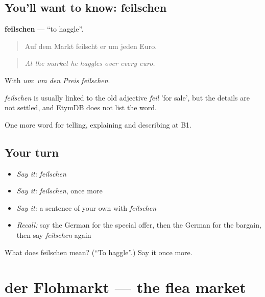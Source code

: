 \subsection*{You'll want to know: feilschen}
\textbf{feilschen} — \textquotedblleft{}to haggle\textquotedblright{}.

\begin{quote}
Auf dem Markt feilscht er um jeden Euro.
\end{quote}

\begin{quote}
\emph{At the market he haggles over every euro.}
\end{quote}

With \emph{um}: \emph{um den Preis feilschen}.

\begin{cousinweb}
\emph{feilschen} is usually linked to the old adjective \emph{feil} 'for sale', but the details are not settled, and EtymDB does not list the word.
\end{cousinweb}

\begin{grammarlens}[title={What you've built}]
One more word for telling, explaining and describing at B1.
\end{grammarlens}

\subsection*{Your turn}
\begin{itemize}
\raggedright
  \item \emph{Say it:} \emph{feilschen}
  \item \emph{Say it:} \emph{feilschen}, once more
  \item \emph{Say it:} a sentence of your own with \emph{feilschen}
  \item \emph{Recall:} say the German for the special offer, then the German for the bargain, then say \emph{feilschen} again
\end{itemize}

\begin{tcolorbox}[breakable,colback=teal!4,colframe=teal!35!black,title={Before you move on}]
What does feilschen mean? (\textquotedblleft{}To haggle\textquotedblright{}.) Say it once more.
\end{tcolorbox}
\section[der Flohmarkt]{der Flohmarkt — the flea market}

